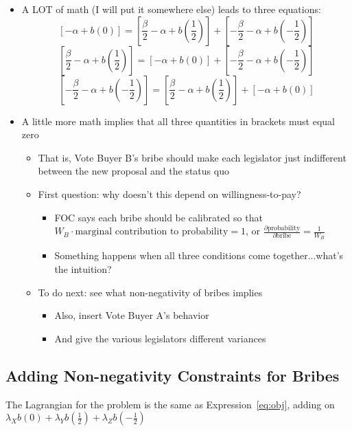 \documentclass[12pt]{article}
\begin{document}
\begin{itemize}
\begin{itemize}
			\item A LOT of math (I will put it somewhere else) leads to three equations:
				\[
				  \left[ - \alpha + b(0) \right] = \left[ \frac{\beta}{2} - \alpha + b\left(\frac{1}{2}\right) \right] + \left[ -\frac{\beta}{2} - \alpha + b\left(-\frac{1}{2}\right) \right]
				\]
				\[
				   \left[ \frac{\beta}{2} - \alpha + b\left(\frac{1}{2}\right) \right] =\left[ - \alpha + b(0) \right]+ \left[ -\frac{\beta}{2} - \alpha + b\left(-\frac{1}{2}\right) \right]
				\]
				\[
				   \left[ -\frac{\beta}{2} - \alpha + b\left(-\frac{1}{2}\right) \right] = \left[ \frac{\beta}{2} - \alpha + b\left(\frac{1}{2}\right) \right] +\left[ - \alpha + b(0) \right]
				\]
			\item A little more math implies that all three quantities in brackets must equal zero
				\begin{itemize}
					\item That is, Vote Buyer B's bribe should make each legislator just indifferent between the new proposal and the status quo
					\item First question: why doesn't this depend on willingness-to-pay?
						\begin{itemize}
							\item FOC says each bribe should be calibrated so that $W_B \cdot \text{marginal contribution to probability} = 1$, or $\frac{\partial \text{probability}}{\partial \text{bribe}} = \frac{1}{W_B}$
							\item Something happens when all three conditions come together...what's the intuition?
						\end{itemize}
					\item To do next: see what non-negativity of bribes implies
						\begin{itemize}
							\item Also, insert Vote Buyer A's behavior
							\item And give the various legislators different variances
						\end{itemize}
				\end{itemize}
		\end{itemize}
\end{itemize}

\subsection{Adding Non-negativity Constraints for Bribes}
The Lagrangian for the problem is the same as Expression~\ref{eq:obj}, adding on $\lambda_X b\left(0\right) + \lambda_Y b\left(\frac{1}{2}\right) + \lambda_Z b\left(-\frac{1}{2}\right)$
\end{document}
